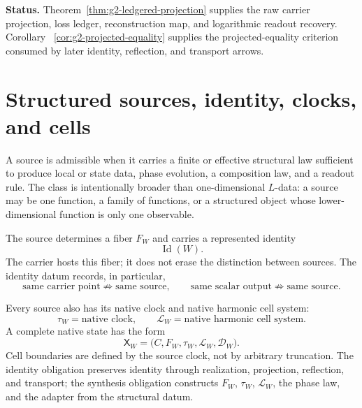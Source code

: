 \documentclass[11pt]{article}
\theoremstyle{definition}
\begin{document}
\noindent\textbf{Status.}
Theorem~\ref{thm:g2-ledgered-projection} supplies the raw carrier projection,
loss ledger, reconstruction map, and logarithmic readout recovery.  Corollary
~\ref{cor:g2-projected-equality} supplies the projected-equality criterion
consumed by later identity, reflection, and transport arrows.
\fi

\section{Structured sources, identity, clocks, and cells}\label{sec:structured-source-state}
A source is admissible when it carries a finite or effective
structural law sufficient to produce local or state data, phase evolution, a
composition law, and a readout rule.  The class is intentionally broader than
one-dimensional \(L\)-data: a source may be one function, a family of
functions, or a structured object whose lower-dimensional function is only one
observable.

The source determines a fiber \(F_W\) and carries a represented identity
\[
\operatorname{Id}(W).
\]
The carrier hosts this fiber; it does not erase the distinction between
sources.  The identity datum records, in particular,
\[
\text{same carrier point}\not\Rightarrow\text{same source},
\qquad
\text{same scalar output}\not\Rightarrow\text{same source}.
\]

Every source also has its native clock and native harmonic cell system:
\[
\tau_W=\text{native clock},
\qquad
\mathcal L_W=\text{native harmonic cell system}.
\]
A complete native state has the form
\[
\mathsf X_W=
\bigl(C,F_W,\tau_W,\mathcal L_W,\mathcal D_W\bigr).
\]
Cell boundaries are defined by the source clock, not by arbitrary truncation.
The identity obligation preserves identity through realization, projection,
reflection, and transport; the synthesis obligation constructs \(F_W\), \(\tau_W\),
\(\mathcal L_W\), the phase law, and the adapter from the structural datum.

\end{document}
